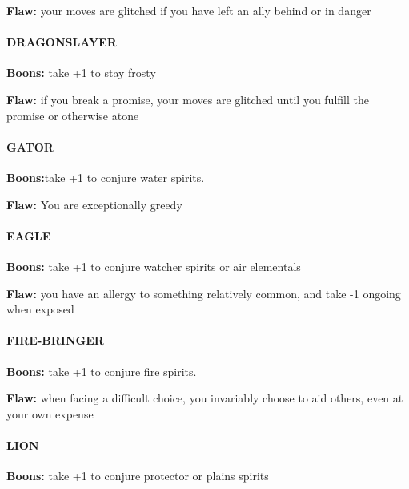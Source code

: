 \documentclass[oneside,10pt]{article}
\begin{document}
\begin{multicols}{2}
\begin{adjustwidth*}{.5cm}{.5cm}
\textbf{Flaw:} your moves are glitched if you have left an ally
behind or in danger
\end{adjustwidth*}


\paragraph{DRAGONSLAYER}
\begin{adjustwidth*}{.5cm}{.5cm}
\textbf{Boons:} take +1 to stay frosty

\textbf{Flaw:} if you break a promise, your moves are glitched until you fulfill the promise or otherwise atone
\end{adjustwidth*}

\paragraph{GATOR}
\begin{adjustwidth*}{.5cm}{.5cm}
\textbf{Boons:}take +1 to conjure water spirits.

\textbf{Flaw:} You are exceptionally greedy
\end{adjustwidth*}


\paragraph{EAGLE}
\begin{adjustwidth*}{.5cm}{.5cm}
\textbf{Boons:} take +1 to conjure watcher spirits or air elementals

\textbf{Flaw:} you have an allergy to something relatively common, and take -1 ongoing when exposed
\end{adjustwidth*}

\paragraph{FIRE-BRINGER}
\begin{adjustwidth*}{.5cm}{.5cm}
\textbf{Boons:} take +1 to conjure fire spirits.

\textbf{Flaw:} when facing a difficult choice, you invariably choose to aid others, even at your own expense
\end{adjustwidth*}


\paragraph{LION}
\begin{adjustwidth*}{.5cm}{.5cm}
\textbf{Boons:} take +1 to conjure protector or plains spirits


\end{adjustwidth*}
\end{multicols}
\end{document}
